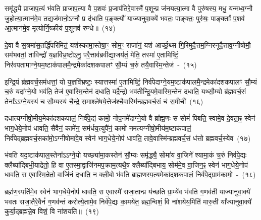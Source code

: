 समृ॑द्ध्यै प्राजाप॒त्यं भ॑वति प्राजाप॒त्या वै प॒शवः॑ प्र॒जा\-प॑तिरे॒वास्मै॑ प॒शून्प्र ज॑नयत्या॒त्मा वै पुरु॑षस्य॒ मधु॒ यन्मध्व॒ग्नौ जु॒होत्या॒त्मान॑मे॒व तद्यज॑मानो॒\-ऽग्नौ प्र द॑धाति प॒ङ्क्त्यौ॑ याज्यानुवा॒क्ये॑ भवतः॒ पाङ्क्तः॒ पुरु॑षः॒ पाङ्क्ताः᳚ प॒शव॑ आ॒त्मान॑मे॒व मृ॒त्योर्नि॒ष्क्रीय॑ प॒शूनव॑ रुन्धे॥~(१४)\ip

{\anuvakamend[{इ॒न्द्रि॒ये᳚\-ऽस्मि॒न्भूम्या॑ ए॒तामिन्द्रः॒ स्यात्तस्मै॒ सोमो॑ बहुरू॒पा हि प॒शव॒ एक॑चत्वारिꣳशच्च}]}

दे॒वा वै स॒त्रमा॑स॒तर्द्धि॑परिमितं॒ यश॑स्कामा॒स्तेषा॒ꣳ॒ सोम॒ꣳ॒ राजा॑नं॒ यश॑ आर्च्छ॒थ्स गि॒रिमुदै॒त्तम॒ग्निरनूदै॒त्ताव॒ग्नी\-षोमौ॒ सम॑भवतां॒ ताविन्द्रो॑ य॒ज्ञवि॑भ्र॒ष्टो\-ऽनु॒ परै॒त्ताव॑ब्रवीद्या॒जय॑तं॒ मेति॒ तस्मा॑ ए॒तामिष्टिं॒ निर॑वपता\-माग्ने॒य\-म॒ष्टाक॑पाल\-मै॒न्द्रमेका॑\-दश\-कपालꣳ सौ॒म्यं च॒रुं तयै॒वास्मि॒न्तेज॑~-~(१५)\ip

इन्द्रि॒यं ब्र॑ह्मवर्च॒सम॑धत्तां॒ यो य॒ज्ञवि॑भ्रष्टः॒ स्यात्तस्मा॑ ए॒तामिष्टिं॒ निर्व॑पेदाग्ने॒यम॒ष्टा\-क॑पालमै॒न्द्र\-मेका॑\-दश\-कपालꣳ सौ॒म्यं च॒रुं यदा᳚ग्ने॒यो भव॑ति॒ तेज॑ ए॒वास्मि॒न्तेन॑ दधाति॒ यदै॒न्द्रो भव॑तीन्द्रि॒यमे॒वास्मि॒न्तेन॑ दधाति॒ यथ्सौ॒म्यो ब्र॑ह्मवर्च॒सं तेना᳚\-ऽऽ\-ग्ने॒यस्य॑ च सौ॒म्यस्य॑ चै॒न्द्रे स॒माश्ले॑षये॒त्तेज॑श्चै॒वास्मि॑न्ब्रह्मवर्च॒सं च॑ स॒मीची॑~(१६)\ip

दधात्यग्नीषो॒मीय॒मेका॑\-दश\-कपालं॒ निर्व॑पे॒द्यं कामो॒ नोप॒नमे॑दा\-ग्ने॒यो वै ब्रा᳚ह्म॒णः स सोमं॑ पिबति॒ स्वामे॒व दे॒वता॒ꣴ॒ स्वेन॑ भाग॒\-धेये॒नोप॑ धावति॒ सैवैनं॒ कामे॑न॒ सम॑र्धय॒त्युपै॑नं॒ कामो॑ नमत्यग्नीषो॒मीय॑म॒ष्टा\-क॑पालं॒ निर्व॑पेद्ब्रह्मवर्च॒सका॑मो॒\-ऽग्नी\-षोमा॑वे॒व स्वेन॑ भाग॒\-धेये॒नोप॑ धावति॒ तावे॒वास्मि॑न्ब्रह्मवर्च॒सं ध॑त्तो ब्रह्मवर्च॒स्ये॑व~(१७)\ip

भ॑वति यद॒ष्टाक॑पाल॒स्तेना᳚\-ऽऽ\-ग्ने॒यो यच्छ्या॑मा॒कस्तेन॑ सौ॒म्यः समृ॑द्ध्यै॒ सोमा॑य वा॒जिने᳚ श्यामा॒कं च॒रुं निर्व॑पे॒द्यः क्लैब्या᳚द्बिभी॒याद्रेतो॒ हि वा ए॒तस्मा॒द्वाजि॑नमप॒क्राम॒त्यथै॒ष क्लैब्या᳚द्बिभाय॒ सोम॑मे॒व वा॒जिन॒ꣴ॒ स्वेन॑ भाग॒\-धेये॒नोप॑ धावति॒ स ए॒वास्मि॒न्रेतो॒ वाजि॑नं दधाति॒ न क्ली॒बो भ॑वति ब्राह्मणस्प॒त्यमेका॑\-दश\-कपालं॒ निर्व॑पे॒द्ग्राम॑कामो॒~-~(१८)\ip

ब्रह्म॑ण॒स्पति॑मे॒व स्वेन॑ भाग॒\-धेये॒नोप॑ धावति॒ स ए॒वास्मै॑ सजा॒तान्प्र य॑च्छति ग्रा॒म्ये॑व भ॑वति ग॒णव॑ती याज्यानुवा॒क्ये॑ भवतः सजा॒तैरे॒वैनं॑ ग॒णव॑न्तं करोत्ये॒तामे॒व निर्व॑पे॒द्यः का॒मये॑त॒ ब्रह्म॒न्विशं॒ वि ना॑शयेय॒मिति॑ मारु॒ती या᳚ज्यानुवा॒क्ये॑ कुर्या॒द्ब्रह्म॑न्ने॒व विशं॒ वि ना॑शयति॥~(१९)\ip

{}

